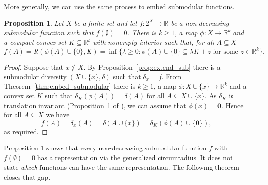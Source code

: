 \documentclass{article}
\theoremstyle{plain}
\newtheorem{proposition}[theorem]{Proposition}
\theoremstyle{definition}
\renewcommand{\Re}{\mathbb{R}}
\begin{document}
More generally, we can use the same process to embed submodular functions. 

\begin{proposition} \label{prop:embed_submod}
Let $X$ be a finite set and let $f:2^X \rightarrow \Re$ be a non-decreasing submodular function such that $f(\emptyset) = 0$. There is $k \geq 1$, a map $\phi:X \rightarrow \Re^k$ and a compact convex set $K \subseteq \Re^k$ with nonempty interior such that, for all $A \subseteq X$
\[f(A) = R(\phi(A) \cup \{0\},K) = \inf \{\lambda \geq 0: \phi(A) \cup \{0\} \subseteq \lambda K + z \mbox{ for some $z \in \Re^k $} \}.\]
\end{proposition}
\begin{proof}
Suppose that $x \not \in X$. By Proposition~\ref{prop:extend_sub} there is a submodular diversity $(X \cup \{x\},\delta)$ such that $\delta_x = f$. From Theorem~\ref{thm:embed_submodular} there is $k \geq 1$, a map $\phi: X \cup \{x\} \rightarrow \Re^k$ and a convex set $K$ such that $\delta_K(\phi(A)) = \delta(A)$ for all $A \subseteq X \cup \{x\}$. As $\delta_K$ is translation invariant (Proposition~1 of \cite{bryant2024linear}), we can assume that $\phi(x) = \mathbf{0}$. Hence for all $A \subseteq X$ we have
\[f(A) = \delta_x(A) = \delta(A \cup \{x\}) = \delta_K(\phi(A) \cup \{\mathbf{0}\}),\]
as required.
\end{proof}

Proposition \ref{prop:embed_submod} shows that every non-decreasing submodular function $f$ with $f(\emptyset) = 0$ has a representation via the generalized circumradius. It does not state {\em which} functions can have the same representation. The following theorem closes that gap.
\end{document}
